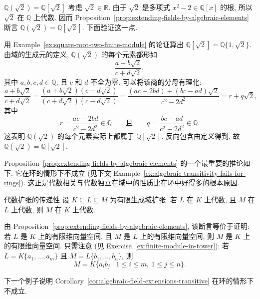 \begin{Example}{{\textmd{$\mathbb{Q}(\sqrt{2})=\mathbb{Q}[\sqrt{2}]$}}}\leavevmode\label{ex:sqrt-two-field-equals-algebra}
考虑 $\sqrt{2}\in\mathbb{R}$. 由于 $\sqrt{2}$ 是多项式 $x^{2}-2\in\mathbb{Q}[x]$ 的根, 所以 $\sqrt{2}$ 在 $\mathbb{Q}$ 上代数. 因而 Proposition~\ref{prop:extending-fields-by-algebraic-elements} 断言 $\mathbb{Q}(\sqrt{2})=\mathbb{Q}[\sqrt{2}]$. 下面验证这一点.

用 Example~\ref{ex:square-root-two-finite-module} 的论证算出 $\mathbb{Q}[\sqrt{2}]=\mathbb{Q}\{1,\sqrt{2}\}$. 由域的生成元的定义, $\mathbb{Q}(\sqrt{2})$ 的每个元素都形如
\[
  \frac{a+b\sqrt{2}}{c+d\sqrt{2}},
\]
其中 $a,b,c,d\in\mathbb{Q}$, 且 $c$ 和 $d$ 不全为零. 可以将该商的分母有理化:
\[
  \frac{a+b\sqrt{2}}{c+d\sqrt{2}}
  =\frac{(a+b\sqrt{2})(c-d\sqrt{2})}{(c+d\sqrt{2})(c-d\sqrt{2})}
  =\frac{(ac-2bd)+(bc-ad)\sqrt{2}}{c^{2}-2d^{2}}=r+q\sqrt{2},
\]
其中
\[
  r=\frac{ac-2bd}{c^{2}-2d^{2}}\in\mathbb{Q}
  \qquad\text{且}\qquad
  q=\frac{bc-ad}{c^{2}-2d^{2}}\in\mathbb{Q}.
\]
这表明 $\mathbb{Q}(\sqrt{2})$ 的每个元素实际上都属于 $\mathbb{Q}[\sqrt{2}]$. 反向包含由定义得到, 故 $\mathbb{Q}(\sqrt{2})=\mathbb{Q}[\sqrt{2}]$.
\end{Example}

Proposition~\ref{prop:extending-fields-by-algebraic-elements} 的一个最重要的推论如下. 它在环的情形下不成立 (见下文 Example~\ref{ex:algebraic-transitivity-fails-for-rings}). 这正是代数相关与代数独立在域中的性质比在环中好得多的根本原因.

\begin{Corollary}{代数扩张的传递性}\leavevmode\label{cor:algebraic-field-extensions-transitive}
设 $K\subseteq L\subseteq M$ 为有限生成域扩张. 若 $L$ 在 $K$ 上代数, 且 $M$ 在 $L$ 上代数, 则 $M$ 在 $K$ 上代数.
\end{Corollary}
\begin{Proof}
由 Proposition~\ref{prop:extending-fields-by-algebraic-elements}, 该断言等价于证明: 若 $L$ 是 $K$ 上的有限维向量空间, 且 $M$ 是 $L$ 上的有限维向量空间, 则 $M$ 是 $K$ 上的有限维向量空间. 只需注意 (见 Exercise~\ref{ex:finite-module-in-tower}): 若 $L=K\{a_{1},\ldots,a_{m}\}$ 且 $M=L\{b_{1},\ldots,b_{n}\}$, 则
\[
  M=K\{a_{i}b_{j}\mid 1\leq i\leq m,\ 1\leq j\leq n\}.
\]
\end{Proof}

下一个例子说明 Corollary~\ref{cor:algebraic-field-extensions-transitive} 在环的情形下不成立.

